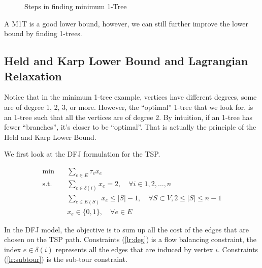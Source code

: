                \begin{figure}[!htp]
                    \centering                
                    \quad
                    \quad
                    \caption{Steps in finding minimum 1-Tree}
                    \label{fig:1tree}
                \end{figure}

                A M1T is a good lower bound, however, we can still further improve the lower bound by finding 1-trees.

            \subsection{Held and Karp Lower Bound and Lagrangian Relaxation}
                Notice that in the minimum 1-tree example, vertices have different degrees, some are of degree 1, 2, 3, or more. However, the ``optimal'' 1-tree that we look for, is an 1-tree such that all the vertices are of degree 2. By intuition, if an 1-tree has fewer ``branches'', it's closer to be ``optimal''. That is actually the principle of the Held and Karp Lower Bound.

                We first look at the DFJ formulation for the TSP.

                \begin{align}
                    \min \quad &\sum_{e \in E} \tau_e x_e \label{lr:obj}\\
                    \text{s.t.} \quad & \sum_{e \in \delta(i)} x_e = 2, \quad \forall i \in 1, 2, \ldots, n\label{lr:deg}\\
                    & \sum_{e \in E(S)} x_e \le |S| - 1, \quad \forall S \subset V, 2 \le |S| \le n - 1 \label{lr:subtour}\\
                    & x_e \in \{0, 1\}, \quad \forall e \in E
                \end{align}

                In the DFJ model, the objective is to sum up all the cost of the edges that are chosen on the TSP path. Constraints (\ref{lr:deg}) is a flow balancing constraint, the index $e\in \delta(i)$ represents all the edges that are induced by vertex $i$. Constraints (\ref{lr:subtour}) is the sub-tour constraint.


